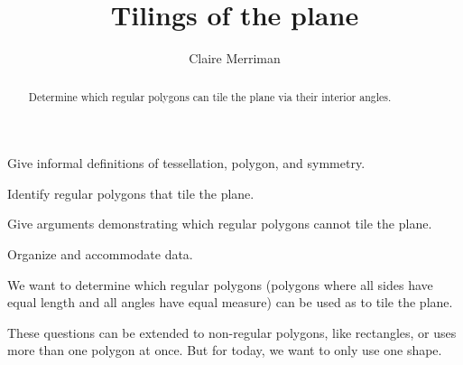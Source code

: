 \documentclass[noauthor,nooutcomes,handout]{ximera}
\title{Tilings of the plane}
\author{Claire Merriman}
\begin{document}
\begin{abstract}
Determine which regular polygons can tile the plane via their interior
angles.
\end{abstract}
\maketitle

\begin{listOutcomes}
\item Give informal definitions of tessellation, polygon, and
  symmetry.
\item Identify regular polygons that tile the plane.
\item Give arguments demonstrating which regular polygons cannot tile
  the plane.
\item Organize and accommodate data.
\end{listOutcomes}


We want to determine which regular polygons (polygons where all sides
have equal length and all angles have equal measure) can be used as to
tile the plane.
 
These questions can be extended to non-regular polygons, like
rectangles, or uses more than one polygon at once. But for today, we
want to only use one shape.

\mynewpage
\end{document}
